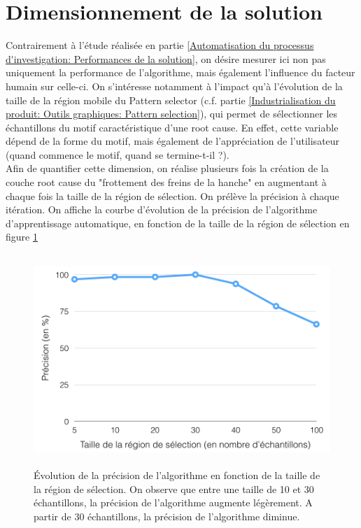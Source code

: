 \section{Dimensionnement de la solution}
\label{Industrialisation du produit: Dimensionnement de la solution}
Contrairement à l'étude réalisée en partie \ref{Automatisation du processus d'investigation: Performances de la solution}, on désire mesurer ici non pas uniquement la performance de l'algorithme, mais également l'influence du facteur humain sur celle-ci. On s'intéresse notamment à l'impact qu'à l'évolution de la taille de la région mobile du Pattern selector (c.f. partie \ref{Industrialisation du produit: Outils graphiques: Pattern selection}), qui permet de sélectionner les échantillons du motif caractéristique d'une root cause. En effet, cette variable dépend de la forme du motif, mais également de l'appréciation de l'utilisateur (quand commence le motif, quand se termine-t-il ?). \\
Afin de quantifier cette dimension, on réalise plusieurs fois la création de la couche root cause du "frottement des freins de la hanche" en augmentant à chaque fois la taille de la région de sélection. On prélève la précision à chaque itération. On affiche la courbe d'évolution de la précision de l'algorithme d'apprentissage automatique, en fonction de la taille de la région de sélection en figure \ref{fig: Evolution de la précision de l'algorithme en fonction de la taille de la région de sélection}

\begin{figure}[H]
	\centering\includegraphics[height=8cm]{images/precision_taille.png}
	\caption[Evolution de la précision de l'algorithme en fonction de la taille de la région de sélection]{Évolution de la précision de l'algorithme en fonction de la taille de la région de sélection.  On observe que entre une taille de 10 et 30 échantillons, la précision de l'algorithme augmente légèrement. A partir de 30 échantillons, la précision de l'algorithme diminue.}
	\label{fig: Evolution de la précision de l'algorithme en fonction de la taille de la région de sélection}
\end{figure} 

